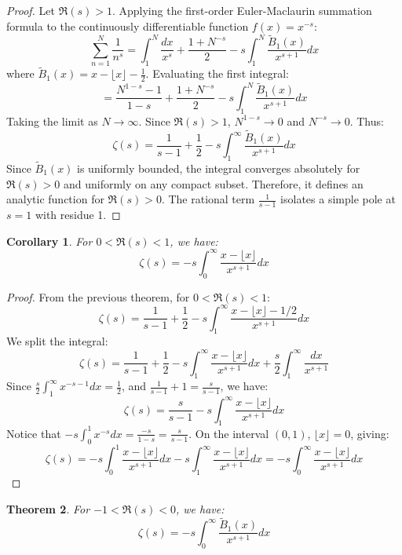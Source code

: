 \documentclass[a4paper,11pt]{article}
\newtheorem{theorem}{Theorem}
\newtheorem{corollary}[theorem]{Corollary}
\begin{document}
\begin{proof}
  Let $\Re(s) > 1$. Applying the first-order Euler-Maclaurin
  summation formula to the continuously differentiable function $f(x) = x^{-s}$:
  \[ \sum_{n=1}^{N} \frac{1}{n^s} = \int_{1}^{N} \frac{dx}{x^s} +
  \frac{1 + N^{-s}}{2} - s \int_{1}^{N} \frac{\tilde{B}_1(x)}{x^{s+1}} dx \]
  where $\tilde{B}_1(x) = x - \lfloor x \rfloor - \frac{1}{2}$.
  Evaluating the first integral:
  \[ = \frac{N^{1-s}-1}{1-s} + \frac{1 + N^{-s}}{2} - s \int_{1}^{N}
  \frac{\tilde{B}_1(x)}{x^{s+1}} dx \]
  Taking the limit as $N \to \infty$. Since $\Re(s) > 1$, $N^{1-s}
  \to 0$ and $N^{-s} \to 0$. Thus:
  \[ \zeta(s) = \frac{1}{s-1} + \frac{1}{2} - s \int_{1}^{\infty}
  \frac{\tilde{B}_1(x)}{x^{s+1}} dx \]
  Since $\tilde{B}_1(x)$ is uniformly bounded, the integral converges
  absolutely for $\Re(s) > 0$ and uniformly on any compact subset.
  Therefore, it defines an analytic function for $\Re(s) > 0$. The
  rational term $\frac{1}{s-1}$ isolates a simple pole at $s=1$ with residue 1.
\end{proof}

\begin{corollary}
  For $0 < \Re(s) < 1$, we have:
  \[ \zeta(s) = -s \int_{0}^{\infty} \frac{x - \lfloor x \rfloor}{x^{s+1}} dx \]
\end{corollary}

\begin{proof}
  From the previous theorem, for $0 < \Re(s) < 1$:
  \[ \zeta(s) = \frac{1}{s-1} + \frac{1}{2} - s \int_{1}^{\infty}
  \frac{x - \lfloor x \rfloor - 1/2}{x^{s+1}} dx \]
  We split the integral:
  \[ \zeta(s) = \frac{1}{s-1} + \frac{1}{2} - s \int_{1}^{\infty}
    \frac{x - \lfloor x \rfloor}{x^{s+1}} dx + \frac{s}{2}
  \int_{1}^{\infty} \frac{dx}{x^{s+1}} \]
  Since $\frac{s}{2} \int_1^\infty x^{-s-1} dx = \frac{1}{2}$, and
  $\frac{1}{s-1} + 1 = \frac{s}{s-1}$, we have:
  \[ \zeta(s) = \frac{s}{s-1} - s \int_{1}^{\infty} \frac{x - \lfloor
  x \rfloor}{x^{s+1}} dx \]
  Notice that $-s \int_0^1 x^{-s} dx = \frac{-s}{1-s} =
  \frac{s}{s-1}$. On the interval $(0,1)$, $\lfloor x \rfloor = 0$, giving:
  \[ \zeta(s) = -s \int_{0}^{1} \frac{x - \lfloor x \rfloor}{x^{s+1}}
    dx - s \int_{1}^{\infty} \frac{x - \lfloor x \rfloor}{x^{s+1}} dx =
  -s \int_{0}^{\infty} \frac{x - \lfloor x \rfloor}{x^{s+1}} dx \]
\end{proof}

\begin{theorem}
  For $-1 < \Re(s) < 0$, we have:
  \[ \zeta(s) = -s \int_{0}^{\infty} \frac{\tilde{B}_1(x)}{x^{s+1}} dx \]
\end{theorem}
\end{document}
